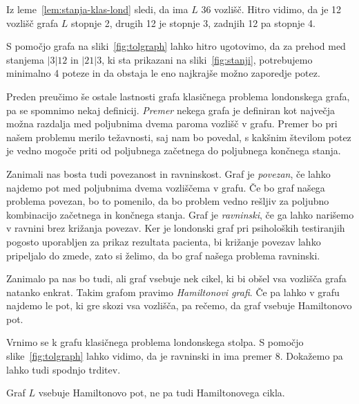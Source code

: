 \documentclass[twoside,11pt]{article}
\begin{document}
Iz leme~\ref{lem:stanja-klas-lond} sledi, da ima $L$ 36 vozlišč. Hitro vidimo, da je 12 vozlišč grafa $L$ stopnje 2, drugih 12 je stopnje 3, zadnjih 12 pa stopnje 4. 

\begin{primer}
    S pomočjo grafa na sliki~\ref{fig:tolgraph} lahko hitro ugotovimo, da za prehod med stanjema $|3|12$ in $|21|3$, ki sta prikazani na sliki~\ref{fig:stanji}, potrebujemo minimalno 4 poteze in da obstaja le eno najkrajše možno zaporedje potez.
\end{primer}

\bigskip

Preden preučimo še ostale lastnosti grafa klasičnega problema londonskega grafa, pa se spomnimo nekaj definicij. \emph{Premer} nekega grafa je definiran kot največja možna razdalja med poljubnima dvema paroma vozlišč v grafu. Premer bo pri našem problemu merilo težavnosti, saj nam bo povedal, s kakšnim številom potez je vedno mogoče priti od poljubnega začetnega do poljubnega končnega stanja.

Zanimali nas bosta tudi povezanost in ravninskost.
Graf je \emph{povezan}, če lahko najdemo pot med poljubnima dvema vozliščema v grafu. Če bo graf našega problema povezan, bo to pomenilo, da bo problem vedno rešljiv za poljubno kombinacijo začetnega in končnega stanja. 
Graf je \emph{ravninski}, če ga lahko narišemo v ravnini brez križanja povezav. Ker je londonski graf pri psiholoških testiranjih pogosto uporabljen za prikaz rezultata pacienta, bi križanje povezav lahko pripeljalo do zmede, zato si želimo, da bo graf našega problema ravninski.

Zanimalo pa nas bo tudi, ali graf vsebuje nek cikel, ki bi obšel vsa vozlišča grafa natanko enkrat. Takim grafom pravimo \emph{Hamiltonovi grafi}. Če pa lahko v grafu najdemo le pot, ki gre skozi vsa vozlišča, pa rečemo, da graf vsebuje Hamiltonovo pot.


Vrnimo se k grafu klasičnega problema londonskega stolpa. S pomočjo slike~\ref{fig:tolgraph} lahko vidimo, da je ravninski in ima premer $8$. Dokažemo pa lahko tudi spodnjo trditev.

\begin{trditev}
    Graf $L$ vsebuje Hamiltonovo pot, ne pa tudi Hamiltonovega cikla.
\end{trditev}
\end{document}
